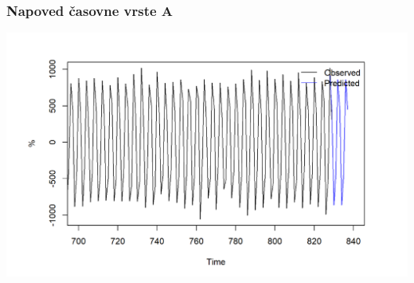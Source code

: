 \documentclass[10pt]{beamer}
\begin{document}
\begin{frame}
\frametitle{Napoved časovne vrste A}
\includegraphics[width=1\textwidth]{predA.png}
\end{frame}
\end{document}
